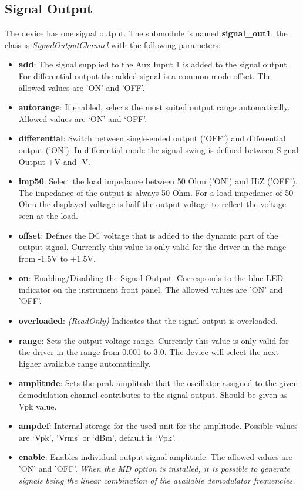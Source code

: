 \documentclass[11pt]{article} %
\begin{document}
\subsection{Signal Output}
The device has one signal output. The submodule is named {\bf signal\_out1}, the class is {\it SignalOutputChannel} with the following parameters:
\begin{itemize}
\item {\bf add}: The signal supplied to the Aux Input 1 is added to the signal output. For differential output the added signal is a common mode offset. The allowed values are 'ON' and 'OFF'.
\item {\bf autorange}: If enabled, selects the most suited output range automatically. Allowed values are `ON' and `OFF'.
\item {\bf differential}: Switch between single-ended output ('OFF') and differential output ('ON'). In differential mode the signal swing is defined between Signal Output +V and -V.
\item {\bf imp50}: Select the load impedance between 50 Ohm ('ON') and HiZ ('OFF'). The impedance of the output is always 50 Ohm. For a load impedance of 50 Ohm the displayed voltage is half the output voltage to reflect the voltage seen at the load.
\item {\bf offset}: Defines the DC voltage that is added to the dynamic part of the output signal. Currently this value is only valid for the driver in the range from -1.5V to +1.5V.
\item {\bf on}: Enabling/Disabling the Signal Output. Corresponds to the blue LED indicator on the instrument front panel. The allowed values are 'ON' and 'OFF'.
\item {\bf overloaded}: {\it (ReadOnly)} Indicates that the signal output is overloaded.
\item {\bf range}: Sets the output voltage range. Currently this value is only valid for the driver in the range from 0.001 to 3.0. The device will select the next higher available range automatically.
\item {\bf amplitude}: Sets the peak amplitude that the oscillator assigned to the given demodulation channel contributes to the signal output. Should be given as Vpk value.
\item {\bf ampdef}: Internal storage for the used unit for the amplitude. Possible values are `Vpk', `Vrms' or `dBm', default is `Vpk'.
\item {\bf enable}: Enables individual output signal amplitude. The allowed values are 'ON' and 'OFF'. {\it When the MD option is installed, it is possible to generate signals being the linear combination of the available demodulator frequencies.}
\end{itemize}
\end{document}
